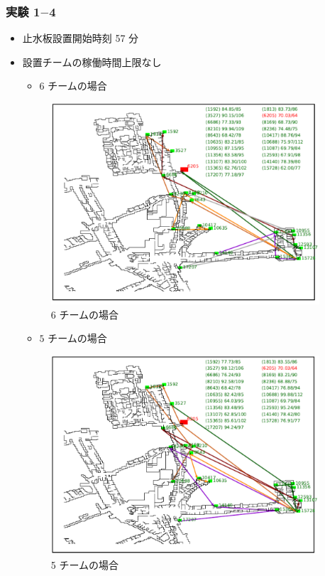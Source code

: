 \documentclass[a4paper,12pt,fleqn]{jarticle}
\begin{document}
\subsubsection{実験 1$-$4}
\begin{itemize}
\item 止水板設置開始時刻 57 分
\item 設置チームの稼働時間上限なし

\begin{itemize}
\item $6$ チームの場合
\end{itemize}

\begin{figure}[H]
\begin{center}
  \includegraphics[width=10cm,clip]{st57_t6_no30.pdf}
  \caption{6 チームの場合}
  \label{fig:st57_t6_no30}
  \end{center}
\end{figure}

\begin{itemize}
\item $5$ チームの場合
\end{itemize}

\begin{figure}[H]
\begin{center}
  \includegraphics[width=10cm,clip]{st57_t5_no30.pdf}
  \caption{5 チームの場合}
  \label{fig:st57_t5_no30}
  \end{center}
\end{figure}


\end{itemize}
\end{document}
